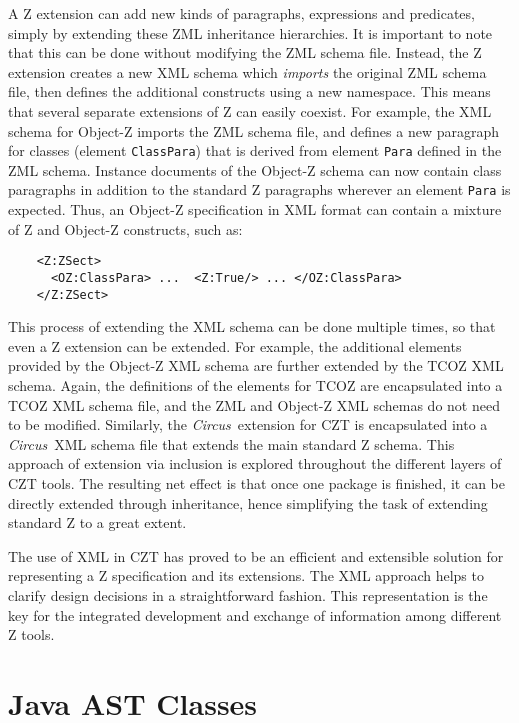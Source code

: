 \documentclass{llncs}
\newcommand{\Circus}{{\sf\slshape Circus}}
\newcommand{\Element}[1]{\texttt{#1}}
\begin{document}
  A Z extension can add new kinds of paragraphs, expressions and predicates,
  simply by extending these ZML inheritance hierarchies.  It is
  important to note that this can be done without modifying the
  ZML schema file.  Instead, the Z extension creates a new XML schema
  which \emph{imports} the original ZML schema file, then defines the
  additional constructs using a new namespace.
  This means that several separate extensions of Z can easily coexist.
  For example, the XML schema for Object-Z imports
  the ZML schema file, and defines a new paragraph for classes (element
  \Element{ClassPara}) that is derived from element \Element{Para}
  defined in the ZML schema.  Instance documents of the Object-Z
  schema can now contain class paragraphs in addition to the standard Z
  paragraphs wherever an element \Element{Para} is expected.  Thus,
  an Object-Z specification in XML format can contain a mixture of
  Z and Object-Z constructs, such as:
\begin{small}
\begin{verbatim}
    <Z:ZSect>
      <OZ:ClassPara> ...  <Z:True/> ... </OZ:ClassPara>
    </Z:ZSect>
\end{verbatim}
\end{small}

  This process of extending the XML schema can be done multiple times, so
  that even a Z extension can be extended.  For example, the
  additional elements provided by the Object-Z XML schema are further
  extended by the TCOZ XML schema.  Again, the definitions of the elements
  for TCOZ are encapsulated into a TCOZ XML schema file, and the ZML and
  Object-Z XML schemas do not need to be modified.
  Similarly, the \Circus\ extension for CZT is encapsulated into a
  \Circus\ XML schema file that extends the main standard Z schema.
  This approach of extension via inclusion is explored throughout the
  different layers of CZT tools.
  The resulting net effect is that once one package is finished, it
  can be directly extended through inheritance, hence simplifying the
  task of extending standard Z to a great extent.

  The use of XML in CZT has proved to be an efficient and extensible
  solution for representing a Z specification and its extensions.  The
  XML approach helps to clarify design decisions in a straightforward
  fashion.  This representation is the key for the integrated
  development and exchange of information among different Z tools.

\section{Java AST Classes}\label{java-ast-classes}
\end{document}
